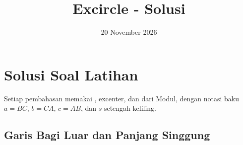 \documentclass[12pt]{scrartcl}
\title{Excircle - Solusi}
\date{20 November 2026}
\begin{document}
\maketitle

\renewcommand*\contentsname{Daftar Isi}
\tableofcontents

\newpage

\section{Solusi Soal Latihan}

Setiap pembahasan memakai ,
excenter, dan  dari Modul,
dengan notasi baku $a = BC$, $b = CA$, $c = AB$, dan $s$ setengah keliling.

\subsection{Garis Bagi Luar dan Panjang Singgung}
\end{document}
